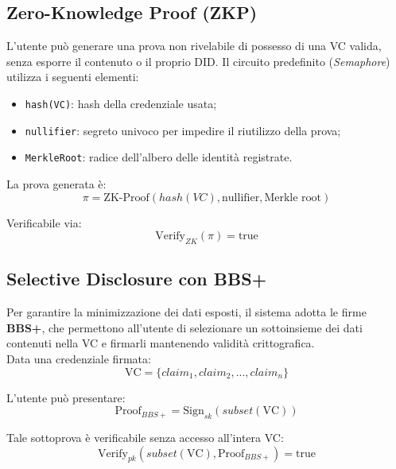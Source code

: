         \subsection{Zero-Knowledge Proof (ZKP)}
            L'utente può generare una prova non rivelabile di possesso di una VC valida, senza esporre il contenuto o il proprio DID.
            Il circuito predefinito (\textit{Semaphore}) utilizza i seguenti elementi:
                \begin{itemize}
                    \item \texttt{hash(VC)}: hash della credenziale usata;
                    
                    \item \texttt{nullifier}: segreto univoco per impedire il riutilizzo della prova;
                    
                    \item \texttt{MerkleRoot}: radice dell'albero delle identità registrate.
                \end{itemize}
            
            La prova generata è:
                \[ \pi = \text{ZK-Proof}(hash(VC), \text{nullifier}, \text{Merkle root}) \]
            
            Verificabile via:
                \[ \text{Verify}_{ZK}(\pi) = \text{true} \]

        \subsection{Selective Disclosure con BBS+}
            Per garantire la minimizzazione dei dati esposti, il sistema adotta le firme \textbf{BBS+}, che permettono all'utente di selezionare un sottoinsieme dei dati contenuti nella VC e firmarli mantenendo validità crittografica. \\
            
            Data una credenziale firmata:
                \[ \text{VC} = \{claim_1, claim_2, ..., claim_n\} \]
            
            L'utente può presentare:
                \[ \text{Proof}_{BBS+} = \text{Sign}_{sk}(subset(\text{VC})) \]
            
            Tale sottoprova è verificabile senza accesso all'intera VC:
                \[ \text{Verify}_{pk}(subset(\text{VC}), \text{Proof}_{BBS+}) = \text{true} \]
        
